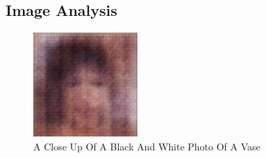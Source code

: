 \documentclass{article}%
\begin{document}
%
\subsection{Image Analysis}%
\label{subsec:ImageAnalysis}%


\begin{figure}[h!]%
\centering%
\includegraphics[width=150px]{500_fake_images/samples_5_233.png}%
\caption{A Close Up Of A Black And White Photo Of A Vase}%
\end{figure}

%
\end{document}
